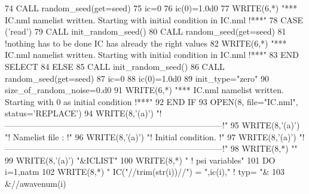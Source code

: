 \begin{DoxyCode}
74            \textcolor{keyword}{CALL }random\_seed(get=seed)
75            ic=0
76            ic(0)=1.0d0
77            \textcolor{keyword}{WRITE}(6,*) \textcolor{stringliteral}{"*** IC.nml namelist written. Starting with initial condition in IC.nml !***"}
78          \textcolor{keywordflow}{CASE} (\textcolor{stringliteral}{'read'})
79            \textcolor{keyword}{CALL }init\_random\_seed()
80            \textcolor{keyword}{CALL }random\_seed(get=seed)
81            \textcolor{comment}{!nothing has to be done IC has already the right values}
82            \textcolor{keyword}{WRITE}(6,*) \textcolor{stringliteral}{"*** IC.nml namelist written. Starting with initial condition in IC.nml !***"}
83 \textcolor{keywordflow}{       END SELECT}
84     \textcolor{keywordflow}{ELSE}
85        \textcolor{keyword}{CALL }init\_random\_seed()
86        \textcolor{keyword}{CALL }random\_seed(get=seed)
87        ic=0
88        ic(0)=1.0d0
89        init\_type=\textcolor{stringliteral}{"zero"}
90        size\_of\_random\_noise=0.d0
91        \textcolor{keyword}{WRITE}(6,*) \textcolor{stringliteral}{"*** IC.nml namelist written. Starting with 0 as initial condition !***"}
92 \textcolor{keywordflow}{    END IF}
93     \textcolor{keyword}{OPEN}(8, file=\textcolor{stringliteral}{"IC.nml"}, status=\textcolor{stringliteral}{'REPLACE'})
94     \textcolor{keyword}{WRITE}(8,\textcolor{stringliteral}{'(a)'}) \textcolor{stringliteral}{"!------------------------------------------------------------------------------!"}
95     \textcolor{keyword}{WRITE}(8,\textcolor{stringliteral}{'(a)'}) \textcolor{stringliteral}{"! Namelist file :                                                              !"}
96     \textcolor{keyword}{WRITE}(8,\textcolor{stringliteral}{'(a)'}) \textcolor{stringliteral}{"! Initial condition.                                                           !"}
97     \textcolor{keyword}{WRITE}(8,\textcolor{stringliteral}{'(a)'}) \textcolor{stringliteral}{"!------------------------------------------------------------------------------!"}
98     \textcolor{keyword}{WRITE}(8,*) \textcolor{stringliteral}{""}
99     \textcolor{keyword}{WRITE}(8,\textcolor{stringliteral}{'(a)'}) \textcolor{stringliteral}{"&ICLIST"}
100     \textcolor{keyword}{WRITE}(8,*) \textcolor{stringliteral}{" ! psi variables"}
101     \textcolor{keywordflow}{DO} i=1,natm
102        \textcolor{keyword}{WRITE}(8,*) \textcolor{stringliteral}{" IC("}//trim(str(i))//\textcolor{stringliteral}{") = "},ic(i),\textcolor{stringliteral}{"   ! typ= "}&
103             &//awavenum(i)%

\end{DoxyCode}
